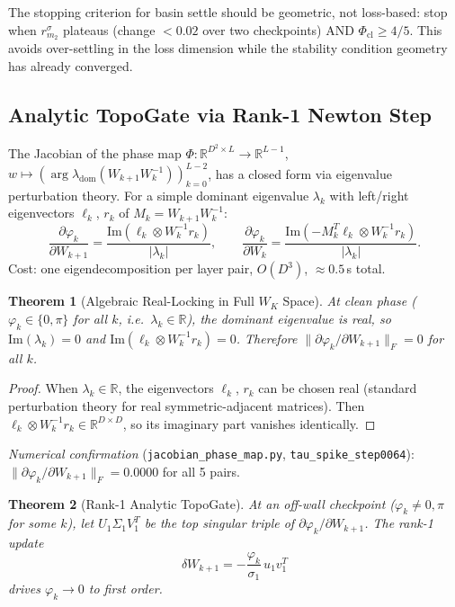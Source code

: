 \documentclass[11pt]{amsart}
\newtheorem{theorem}{Theorem}[section]
\begin{document}
The stopping criterion for basin settle should be geometric, not
loss-based: stop when $r_{m_2}^\sigma$ plateaus (change $< 0.02$
over two checkpoints) AND $\Phi_\mathrm{cl} \geq 4/5$.
This avoids over-settling in the loss dimension while the stability
condition geometry has already converged.

\subsection{Analytic TopoGate via Rank-1 Newton Step}
\label{sec:analytic_topogate}

The Jacobian of the phase map $\Phi: \mathbb{R}^{D^2 \times L} \to \mathbb{R}^{L-1}$,
$w \mapsto (\arg \lambda_\mathrm{dom}(W_{k+1}W_k^{-1}))_{k=0}^{L-2}$,
has a closed form via eigenvalue perturbation theory.
For a simple dominant eigenvalue $\lambda_k$ with left/right eigenvectors
$\ell_k$, $r_k$ of $M_k = W_{k+1}W_k^{-1}$:
\[
  \frac{\partial \varphi_k}{\partial W_{k+1}} 
  = \frac{\mathrm{Im}(\ell_k \otimes W_k^{-1}r_k)}{|\lambda_k|}, \qquad
  \frac{\partial \varphi_k}{\partial W_k}
  = \frac{\mathrm{Im}(-M_k^T\ell_k \otimes W_k^{-1}r_k)}{|\lambda_k|}.
\]
Cost: one eigendecomposition per layer pair, $O(D^3)$, $\approx 0.5$\,s total.

\begin{theorem}[Algebraic Real-Locking in Full $W_K$ Space]
\label{thm:jacobian_locking}
At clean phase ($\varphi_k \in \{0, \pi\}$ for all $k$,
i.e.\ $\lambda_k \in \mathbb{R}$), the dominant eigenvalue is real,
so $\mathrm{Im}(\lambda_k) = 0$ and $\mathrm{Im}(\ell_k \otimes W_k^{-1}r_k) = 0$.
Therefore $\|\partial\varphi_k/\partial W_{k+1}\|_F = 0$ for all $k$.
\end{theorem}

\begin{proof}
When $\lambda_k \in \mathbb{R}$, the eigenvectors $\ell_k$, $r_k$
can be chosen real (standard perturbation theory for real symmetric-adjacent matrices).
Then $\ell_k \otimes W_k^{-1}r_k \in \mathbb{R}^{D \times D}$,
so its imaginary part vanishes identically.
\end{proof}

\emph{Numerical confirmation} (\texttt{jacobian\_phase\_map.py},
\texttt{tau\_spike\_step0064}):
$\|\partial\varphi_k/\partial W_{k+1}\|_F = 0.0000$ for all 5 pairs.

\begin{theorem}[Rank-1 Analytic TopoGate]
\label{thm:rank1_topogate}
At an off-wall checkpoint ($\varphi_k \neq 0, \pi$ for some $k$),
let $U_1 \Sigma_1 V_1^T$ be the top singular triple of
$\partial\varphi_k/\partial W_{k+1}$.
The rank-1 update
\[
  \delta W_{k+1} = -\frac{\varphi_k}{\sigma_1} \, u_1 v_1^T
\]
drives $\varphi_k \to 0$ to first order.
\end{theorem}
\end{document}
